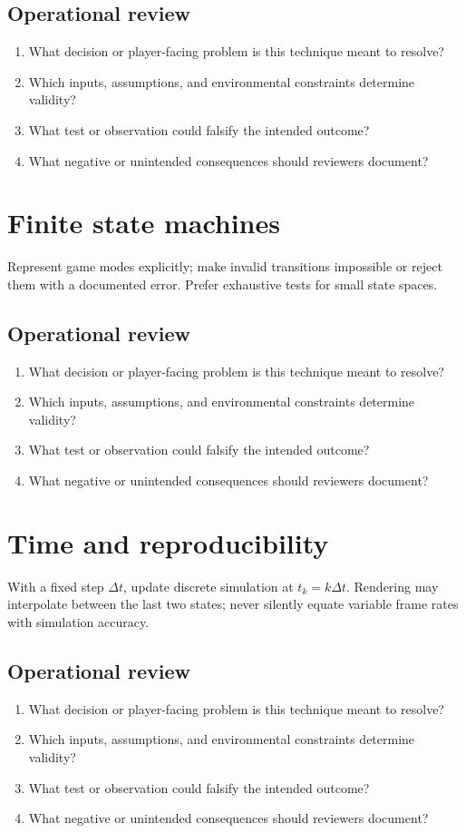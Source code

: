 \documentclass[11pt]{article}
\begin{document}
\subsection{Operational review}
\begin{enumerate}
\item What decision or player-facing problem is this technique meant to resolve?
\item Which inputs, assumptions, and environmental constraints determine validity?
\item What test or observation could falsify the intended outcome?
\item What negative or unintended consequences should reviewers document?
\end{enumerate}

\section{Finite state machines}
Represent game modes explicitly; make invalid transitions impossible or reject them with a documented error. Prefer exhaustive tests for small state spaces.


\subsection{Operational review}
\begin{enumerate}
\item What decision or player-facing problem is this technique meant to resolve?
\item Which inputs, assumptions, and environmental constraints determine validity?
\item What test or observation could falsify the intended outcome?
\item What negative or unintended consequences should reviewers document?
\end{enumerate}

\section{Time and reproducibility}
With a fixed step $\Delta t$, update discrete simulation at $t_k=k\Delta t$. Rendering may interpolate between the last two states; never silently equate variable frame rates with simulation accuracy.


\subsection{Operational review}
\begin{enumerate}
\item What decision or player-facing problem is this technique meant to resolve?
\item Which inputs, assumptions, and environmental constraints determine validity?
\item What test or observation could falsify the intended outcome?
\item What negative or unintended consequences should reviewers document?
\end{enumerate}
\end{document}
